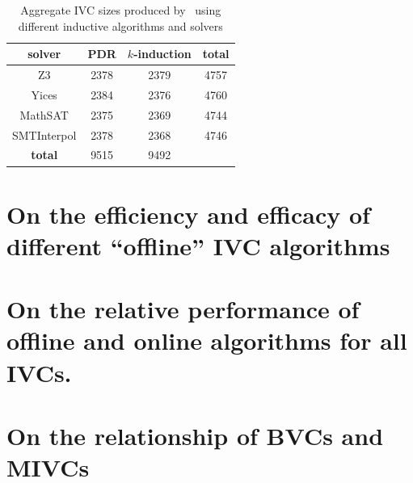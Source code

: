 
\begin{table}
  \caption{Aggregate IVC sizes produced by \ucalg\ using different inductive algorithms and solvers}
  \centering
  \begin{tabular}{ |c|c|c|c| }
    \hline
     solver & PDR & $k$-induction & \textbf{total} \\
    \hline
      Z3 & 2378 & 2379 & 4757 \\
      Yices & 2384 & 2376 & 4760 \\
      MathSAT & 2375 & 2369 & 4744 \\
      SMTInterpol & 2378 & 2368 & 4746 \\
    \hline
      \textbf{total} & 9515 & 9492 &   \\
    \hline
  \end{tabular}
  \label{tab:minimality-algorithm-solvers}
\end{table}



\section{On the efficiency and efficacy of different ``offline'' IVC algorithms}
\label{sec:exp1}


\section{On the relative performance of offline and online algorithms for all IVCs.}
\label{sec:exp2}



\section{On the relationship of BVCs and MIVCs}
\label{sec:exp3}


